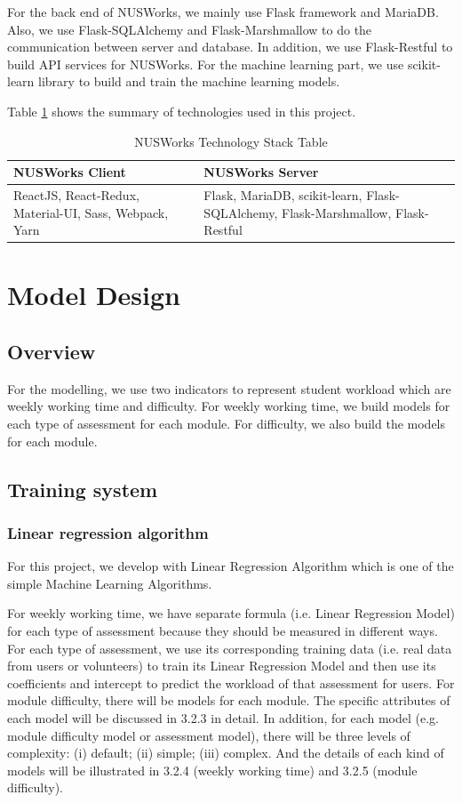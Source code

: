 \documentclass[fyp]{socreport}
\begin{document}
For the back end of NUSWorks, we mainly use Flask framework and MariaDB. Also, we use Flask-SQLAlchemy and Flask-Marshmallow to do the communication between server and database. In addition, we use Flask-Restful to build API services for NUSWorks. For the machine learning part, we use scikit-learn library to build and train the machine learning models.

Table {\ref{technology-stack}} shows the summary of technologies used in this project.

\begin{table}[]
\centering
\begin{tabular}{|p{}|p{}|}
\hline
	\rowcolor[HTML]{C0C0C0}
  \textbf{NUSWorks Client} & \textbf{NUSWorks Server} \\
\hline
ReactJS, React-Redux, Material-UI, Sass, Webpack, Yarn & Flask, MariaDB, scikit-learn, Flask-SQLAlchemy, Flask-Marshmallow, Flask-Restful\\
\hline
\end{tabular}
\caption{NUSWorks Technology Stack Table}
\label{technology-stack}
\end{table}

\section{Model Design}
\subsection{Overview}
For the modelling, we use two indicators to represent student workload which are weekly working time and difficulty. For weekly working time, we build models for each type of assessment for each module. For difficulty, we also build the models for each module.

\subsection{Training system}
\subsubsection{Linear regression algorithm}
For this project, we develop with Linear Regression Algorithm which is one of the simple Machine Learning Algorithms.

For weekly working time, we have separate formula (i.e. Linear Regression Model) for each type of assessment because they should be measured in different ways. For each type of assessment, we use its corresponding training data (i.e. real data from users or volunteers) to train its Linear Regression Model and then use its coefficients and intercept to predict the workload of that assessment for users. For module difficulty, there will be models for each module. The specific attributes of each model will be discussed in 3.2.3 in detail. In addition, for each model (e.g. module difficulty model or assessment model), there will be three levels of complexity: (i) default; (ii) simple; (iii) complex. And the details of each kind of models will be illustrated in 3.2.4 (weekly working time) and 3.2.5 (module difficulty).
\end{document}
